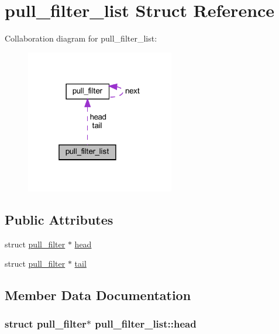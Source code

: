 \hypertarget{structpull__filter__list}{}\section{pull\+\_\+filter\+\_\+list Struct Reference}
\label{structpull__filter__list}


Collaboration diagram for pull\+\_\+filter\+\_\+list\+:
\nopagebreak
\begin{figure}[H]
\begin{center}
\leavevmode
\includegraphics[width=184pt]{structpull__filter__list__coll__graph}
\end{center}
\end{figure}
\subsection*{Public Attributes}
\begin{DoxyCompactItemize}
\item 
struct \hyperlink{structpull__filter}{pull\+\_\+filter} $\ast$ \hyperlink{structpull__filter__list_aebf8fe050b62b1f64f80f9f77c6f0f77}{head}
\item 
struct \hyperlink{structpull__filter}{pull\+\_\+filter} $\ast$ \hyperlink{structpull__filter__list_a30c7e98b27b7aeac18be4e3341f1038d}{tail}
\end{DoxyCompactItemize}


\subsection{Member Data Documentation}
\hypertarget{structpull__filter__list_aebf8fe050b62b1f64f80f9f77c6f0f77}{}
\subsubsection[{head}]{\setlength{\rightskip}{0pt plus 5cm}struct {\bf pull\+\_\+filter}$\ast$ pull\+\_\+filter\+\_\+list\+::head}\label{structpull__filter__list_aebf8fe050b62b1f64f80f9f77c6f0f77}
\hypertarget{structpull__filter__list_a30c7e98b27b7aeac18be4e3341f1038d}{}

